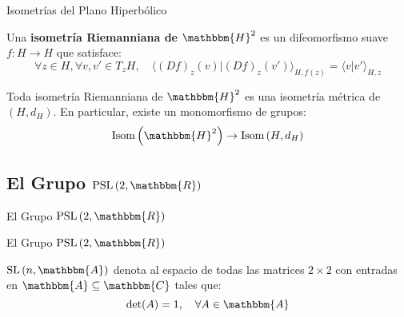 \documentclass[xcolor=dvipsnames]{beamer}
\theoremstyle{largebreak}
\newcommand\cf[3]{\ensuremath{#1:#2\rightarrow#3}}
\newcommand{\bbm}[1]{\ensuremath{\mathbbm{#1}}}
\newcommand{\pint}[2]{\langle#1\big|#2 \rangle}
\newcommand{\Isom}[1]{\ensuremath{\textup{Isom}\left(#1\right)}}
\newcommand{\SL}[1]{\ensuremath{\textup{SL}\left(#1\right)}}
\newcommand{\PSL}[1]{\ensuremath{\textup{PSL}\left(#1\right)}}
\begin{document}
\begin{frame}{Isometrías del Plano Hiperbólico}
    \begin{mydef}
        Una \textbf{isometría Riemanniana de $\bbm{H}^2$} es un difeomorfismo suave $\cf{f}{H}{H}$ que satisface:
        \begin{equation*}
            \forall z\in H, \forall v,v'\in T_zH,\quad\pint{(Df)_z(v)}{(Df)_z(v')}_{H,f(z)}=\pint{v}{v'}_{H,z}
        \end{equation*}
    \end{mydef}

    \begin{propo}
        Toda isometría Riemanniana de $\bbm{H}^2$ es una isometría métrica de $(H,d_H)$. En particular, existe un monomorfismo de grupos:
        \begin{equation*}
            \Isom{\bbm{H}^2}\rightarrow \Isom{H,d_H}
        \end{equation*}
    \end{propo}
\end{frame}

\subsection{El Grupo $\PSL{2,\bbm{R}}$}

\begin{frame}
    \begin{center}
        El Grupo $\PSL{2,\bbm{R}}$
    \end{center}
\end{frame}

\begin{frame}{El Grupo $\PSL{2,\bbm{R}}$}
    \begin{mydef}
        $\SL{n,\bbm{A}}$ denota al espacio de todas las matrices $2\times 2$ con entradas en $\bbm{A}\subseteq\bbm{C}$ tales que:
        \begin{equation*}
            \det(A)=1,\quad\forall A\in\bbm{A}
        \end{equation*}
    \end{mydef}
\end{frame}
\end{document}
